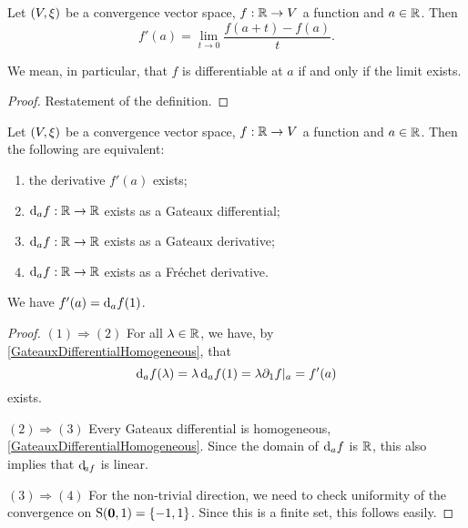 \begin{lemma} \label{elementaryRealDomainDerivative}
Let $\sSet{V,\xi}$ be a convergence vector space, $f: \mathbb{R} \to V$ a function and $a\in \mathbb{R}$. Then
\[ f'(a) = \lim_{t\to 0} \frac{f(a+t) - f(a)}{t}. \]
\end{lemma}
We mean, in particular, that $f$ is differentiable at $a$ if and only if the limit exists.
\begin{proof}
Restatement of the definition.
\end{proof}

\begin{proposition} \label{realDomainDerivativeIsFrechet}
Let $\sSet{V,\xi}$ be a convergence vector space, $f: \mathbb{R} \to V$ a function and $a\in \mathbb{R}$. Then the following are equivalent:
\begin{enumerate}
\item the derivative $f'(a)$ exists;
\item $\operatorname{d \!}{_af}: \mathbb{R} \to \mathbb{R}$ exists as a Gateaux differential;
\item $\operatorname{d \!}{_af}: \mathbb{R} \to \mathbb{R}$ exists as a Gateaux derivative;
\item $\operatorname{d \!}{_af}: \mathbb{R} \to \mathbb{R}$ exists as a Fréchet derivative.
\end{enumerate}
\end{proposition}
We have $f'(a) = \operatorname{d \!}{_af}(1)$.
\begin{proof}
$(1) \Rightarrow (2)$ For all $\lambda \in \mathbb{R}$, we have, by \ref{GateauxDifferentialHomogeneous}, that
\[ \operatorname{d \!}{_af}(\lambda) = \lambda \operatorname{d \!}{_af}(1) = \lambda \partial_1f|_a = f'(a) \]
exists.

$(2) \Rightarrow (3)$ Every Gateaux differential is homogeneous, \ref{GateauxDifferentialHomogeneous}. Since the domain of $\operatorname{d \!}{_af}$ is $\mathbb{R}$, this also implies that $\operatorname{d \!}_{af}$ is linear.

$(3) \Rightarrow (4)$ For the non-trivial direction, we need to check uniformity of the convergence on $\operatorname{S}(\boldsymbol{\mathrm{0}}, 1) = \{-1,1\}$. Since this is a finite set, this follows easily.
\end{proof}



